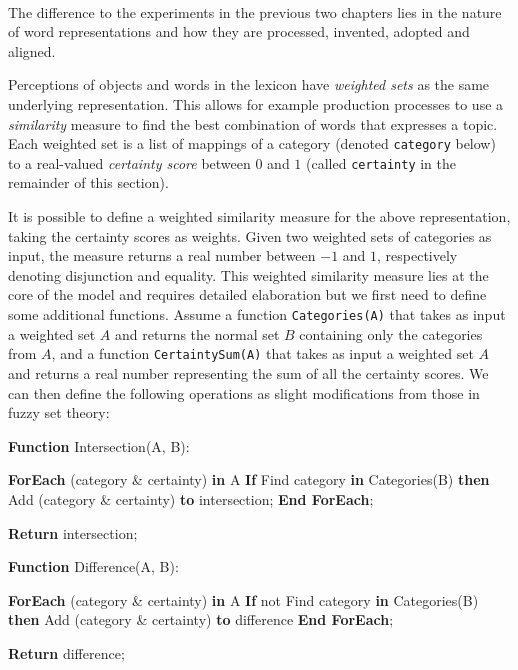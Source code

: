 ~\\

The difference to the experiments in the previous two chapters lies in
the nature of word representations and how they are processed,
invented, adopted and aligned.


 Perceptions of objects and words in the
lexicon have \emph{weighted sets} as the same underlying
representation. This allows for example production processes to use a
\emph{similarity} measure to find the best combination of words that
expresses a topic. Each weighted set is a list of mappings of a
category (denoted \texttt{category} below) to a real-valued
\emph{certainty score} between $0$ and $1$ (called \texttt{certainty} in
the remainder of this section).

 It is possible to
define a weighted similarity measure for the above representation,
taking the certainty scores as weights. Given two weighted sets of
categories as input, the measure returns a real number between $-1$
and $1$, respectively denoting disjunction and equality. This weighted
similarity measure lies at the core of the model and requires detailed
elaboration but we first need to define some additional functions.
Assume a function \texttt{Categories(A)} that takes as input a
weighted set $A$ and returns the normal set $B$ containing only the
categories from $A$, and a function \texttt{CertaintySum(A)} that
takes as input a weighted set $A$ and returns a real number
representing the sum of all the certainty scores.  We can then define
the following operations as slight modifications from those in fuzzy
set theory:

\begin{verbatim+}
\textbf{Function} Intersection(A, B):

\textbf{ForEach} (category \& certainty) \textbf{in} A
    \textbf{If} Find category \textbf{in} Categories(B)
    \textbf{then} Add (category \& certainty) \textbf{to} intersection;
\textbf{End ForEach};

\textbf{Return} intersection;
\end{verbatim+}



\begin{verbatim+}
\textbf{Function} Difference(A, B):

\textbf{ForEach} (category \& certainty) \textbf{in} A
    \textbf{If} not Find category \textbf{in} Categories(B)
    \textbf{then} Add (category \& certainty) \textbf{to} difference
\textbf{End ForEach};

\textbf{Return} difference;
\end{verbatim+}


